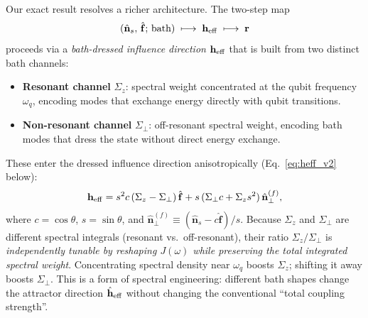 Our exact result resolves a richer architecture.  The two-step map
\begin{equation}
(\hat{\mathbf n}_s,\,\hat{\mathbf f};\,\text{bath})
\;\longmapsto\; \mathbf h_{\rm eff}
\;\longmapsto\; \mathbf r
\label{eq:two_step_map}
\end{equation}
proceeds via a \emph{bath-dressed influence direction} $\mathbf h_{\rm eff}$
that is built from two distinct bath channels:
\begin{itemize}
  \item \textbf{Resonant channel} $\Sigma_z$: spectral weight concentrated at
  the qubit frequency $\omega_q$, encoding modes that exchange energy directly
  with qubit transitions.
  \item \textbf{Non-resonant channel} $\Sigma_\perp$: off-resonant spectral
  weight, encoding bath modes that dress the state without direct energy
  exchange.
\end{itemize}
These enter the dressed influence direction anisotropically
(Eq.~\eqref{eq:heff_v2} below):
\begin{equation}
\mathbf h_{\rm eff}
= s^2 c\,(\Sigma_z - \Sigma_\perp)\,\hat{\mathbf f}
+ s\,(\Sigma_\perp c + \Sigma_z s^2)\,\hat{\mathbf n}^{(f)}_\perp,
\label{eq:heff_v2}
\end{equation}
where $c=\cos\theta$, $s=\sin\theta$, and $\hat{\mathbf n}^{(f)}_\perp \equiv
(\hat{\mathbf n}_s - c\hat{\mathbf f})/s$.  Because $\Sigma_z$ and
$\Sigma_\perp$ are different spectral integrals (resonant vs.\ off-resonant),
their ratio $\Sigma_z/\Sigma_\perp$ is \emph{independently tunable by
reshaping $J(\omega)$ while preserving the total integrated spectral weight}.
Concentrating spectral density near $\omega_q$ boosts $\Sigma_z$; shifting it
away boosts $\Sigma_\perp$.  This is a form of spectral engineering: different
bath shapes change the attractor direction $\hat{\mathbf h}_{\rm eff}$ without
changing the conventional ``total coupling strength''.

